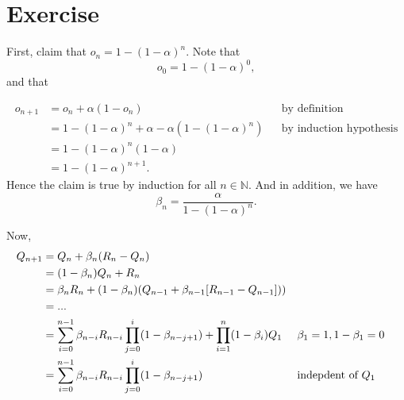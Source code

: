 \documentclass[11pt,a4paper]{report}
\begin{document}
\section{Exercise}

First, claim that $o_n = 1-(1-\alpha)^n$. Note that 
$$ o_0 = 1 - (1-\alpha)^0,$$
and that 

\begin{equation}\label{o_n induction}
\begin{aligned}
o_{n+1} &= o_n + \alpha(1-o_n) &&\text{by definition} \\
		&= 1-(1-\alpha)^n + \alpha - \alpha (1-(1-\alpha)^n) &&\text{by induction hypothesis}\\
		&= 1 - (1-\alpha)^n (1-\alpha) \\
		&= 1-(1-\alpha)^{n+1}.
\end{aligned}
\end{equation}
Hence the claim is true by induction for all $n\in \mathbb{N}$. And in addition, we have 
$$\beta_n = \frac{\alpha}{1-(1-\alpha)^n}.$$

Now,
\begin{equation}\label{Q_{n+1} deduction}
\begin{aligned}
Q_{n+1} &= Q_n + \beta_n(R_n-Q_n) \\
		&= (1-\beta_n) Q_n + R_n \\
		&= \beta_nR_n + (1-\beta_n)(Q_{n-1} + \beta_{n-1}[R_{n-1} - Q_{n-1}])) \\
		&= ... \\
		&= \sum_{i=0}^{n-1} \beta_{n-i}R_{n-i} \prod_{j=0}^{i}(1-\beta_{n-j+1})  + 
		\prod_{i=1}^{n}(1-\beta_i)Q_1 && {\beta_1 = 1, 1-\beta_1 = 0} \\
		&= \sum_{i=0}^{n-1} \beta_{n-i}R_{n-i} \prod_{j=0}^{i}(1-\beta_{n-j+1}) &&\text{indepdent of } Q_1 
\end{aligned}
\end{equation}
 
\end{document}
